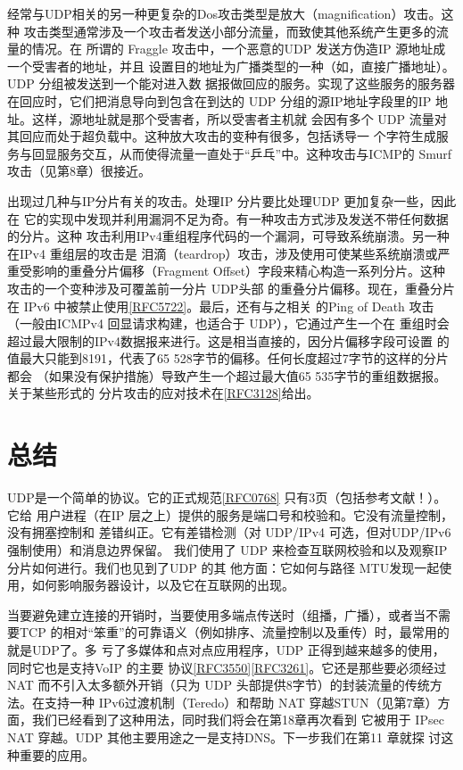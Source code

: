 经常与UDP相关的另一种更复杂的Dos攻击类型是放大（magnification）攻击。这种
攻击类型通常涉及一个攻击者发送小部分流量，而致使其他系统产生更多的流量的情况。在
所谓的 Fraggle 攻击中，一个恶意的UDP 发送方伪造IP 源地址成一个受害者的地址，并且
设置目的地址为广播类型的一种（如，直接广播地址）。UDP 分组被发送到一个能对进入数
据报做回应的服务。实现了这些服务的服务器在回应时，它们把消息导向到包含在到达的
UDP 分组的源IP地址字段里的IP 地址。这样，源地址就是那个受害者，所以受害者主机就
会因有多个 UDP 流量对其回应而处于超负载中。这种放大攻击的变种有很多，包括诱导一
个字符生成服务与回显服务交互，从而使得流量一直处于“乒乓”中。这种攻击与ICMP的
Smurf 攻击（见第8章）很接近。

出现过几种与IP分片有关的攻击。处理IP 分片要比处理UDP 更加复杂一些，因此在
它的实现中发现并利用漏洞不足为奇。有一种攻击方式涉及发送不带任何数据的分片。这种
攻击利用IPv4重组程序代码的一个漏洞，可导致系统崩溃。另一种在IPv4 重组层的攻击是
泪滴（teardrop）攻击，涉及使用可使某些系统崩溃或严重受影响的重叠分片偏移（Fragment
Offset）字段来精心构造一系列分片。这种攻击的一个变种涉及可覆盖前一分片 UDP头部
的重叠分片偏移。现在，重叠分片在 IPv6 中被禁止使用\href{https://www.rfc-editor.org/rfc/rfc5722}{[RFC5722]}。最后，还有与之相关
的Ping of Death 攻击（一般由ICMPv4 回显请求构建，也适合于 UDP），它通过产生一个在
重组时会超过最大限制的IPv4数据报来进行。这是相当直接的，因分片偏移字段可设置
的值最大只能到8191，代表了65 528字节的偏移。任何长度超过7字节的这样的分片都会
（如果没有保护措施）导致产生一个超过最大值65 535字节的重组数据报。关于某些形式的
分片攻击的应对技术在\href{https://www.rfc-editor.org/rfc/rfc3128}{[RFC3128]}给出。

\section{总结}
UDP是一个简单的协议。它的正式规范\href{https://www.rfc-editor.org/rfc/rfc0768}{[RFC0768]} 只有3页（包括参考文献！）。它给
用户进程（在IP 层之上）提供的服务是端口号和校验和。它没有流量控制，没有拥塞控制和
差错纠正。它有差错检测（对 UDP/IPv4 可选，但对UDP/IPv6强制使用）和消息边界保留。
我们使用了 UDP 来检查互联网校验和以及观察IP 分片如何进行。我们也见到了UDP 的其
他方面：它如何与路径 MTU发现一起使用，如何影响服务器设计，以及它在互联网的出现。

当要避免建立连接的开销时，当要使用多端点传送时（组播，广播），或者当不需要TCP
的相对“笨重”的可靠语义（例如排序、流量控制以及重传）时，最常用的就是UDP了。多
亏了多媒体和点对点应用程序，UDP 正得到越来越多的使用，同时它也是支持VoIP 的主要
协议\href{https://www.rfc-editor.org/rfc/rfc3550}{[RFC3550]}\href{https://www.rfc-editor.org/rfc/rfc3261}{[RFC3261]}。它还是那些要必须经过 NAT 而不引入太多额外开销（只为 UDP
头部提供8字节）的封装流量的传统方法。在支持一种 IPv6过渡机制（Teredo）和帮助 NAT
穿越STUN（见第7章）方面，我们已经看到了这种用法，同时我们将会在第18章再次看到
它被用于 IPsec NAT 穿越。UDP 其他主要用途之一是支持DNS。下一步我们在第11 章就探
讨这种重要的应用。

